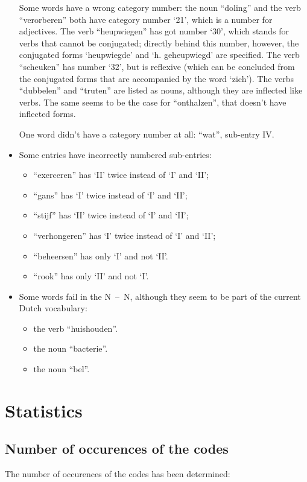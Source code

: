 \begin{itemize}
        Some words have a wrong category number: the noun ``doling'' and the 
        verb ``verorberen'' both have 
        category number `21', which is a number for adjectives. The verb
        ``heupwiegen'' has got number `30', which stands for verbs that cannot
        be conjugated; directly behind this number, however, the conjugated forms
        `heupwiegde' and `h. geheupwiegd' are specified. The verb 
        ``scheuken'' has number `32', but is reflexive (which can be concluded
        from the conjugated forms that are accompanied by the word `zich').
        The verbs ``dubbelen'' and ``truten'' are listed as nouns, although
        they are inflected like verbs. The same seems to be the case for 
        ``onthalzen'', that doesn't have inflected forms. 

        One word didn't have a category number at all: ``wat'', sub-entry IV.
        
  \item Some entries have incorrectly numbered sub-entries:
     \begin{itemize}
        \item ``exerceren'' has `II' twice instead of `I' and `II';
        \item ``gans'' has `I' twice instead of `I' and `II';
        \item ``stijf'' has `II' twice instead of `I' and `II';
        \item ``verhongeren'' has `I' twice instead of `I' and `II';
        \item ``beheersen'' has only `I' and not `II'.
        \item ``rook'' has only `II' and not `I'.
    \end{itemize}
  \item Some words fail in the N~--~N, although they seem to be part of 
        the current Dutch vocabulary:
     \begin{itemize}
        \item the verb ``huishouden''.
        \item the noun ``bacterie''.
        \item the noun ``bel''.
    \end{itemize}
\end{itemize}
\newpage
\section{Statistics}
\subsection{Number of occurences of the codes}
The number of occurences of the codes has been determined:

